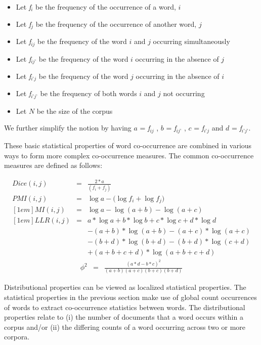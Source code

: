 \begin{itemize}[noitemsep]
\item[] Let \emph{f$_{i}$} be the frequency of the occurrence of a word, $i$
\item[] Let \emph{f$_{j}$} be the frequency of the occurrence of another word, $j$
\item[] Let \emph{f$_{ij}$} be the frequency of the word $i$ and $j$ occurring simultaneously
\item[] Let \emph{f$_{ij’}$} be the frequency of the word $i$ occurring in the absence of $j$
\item[] Let \emph{f$_{i’j}$} be the frequency of the word $j$ occurring in the absence of $i$
\item[] Let \emph{f$_{i’j’}$} be the frequency of both words $i$ and $j$ not occurring
\item[] Let $N$ be the size of the corpus
\end{itemize}

We further simplify the notion by having $a$ = \emph{f$_{ij}$} , $b$ = \emph{f$_{ij’}$} , $c$ = \emph{f$_{i’j}$} and $d$ =\emph{ f$_{i’j’}$}.

These basic statistical properties of word co-occurrence are combined in various ways to form more complex co-occurrence measures. The common co-occurrence measures are defined as follows:

\begin{eqnarray} 
Dice(i,j) & = & \frac { 2*a }{ ({ f }_{ i }+{ f }_{ j }) }  \\[1em]
PMI(i,j) & = & \log { a } -(\log { { f }_{ i } } +\log { { f }_{ j }) }  \\ [1em]
MI(i,j) & = & \log { a } -\log { (a+b) } -\log { (a+c) }  \\ [1em]
LLR(i,j) & = & a*\log { a } +b*\log { b } +c*\log { c } +d*\log { d }  \nonumber\\  
&  & -(a+b)*\log { (a+b) } -(a+c)*\log { (a+c) }  \nonumber\\  
&  & -(b+d)*\log { (b+d) } -(b+d)*\log { (c+d) }  \nonumber\\  
&  & +(a+b+c+d)*\log { (a+b+c+d) } 
\end{eqnarray}
\begin{eqnarray} 
{ \phi  }^{ 2 } & = & \frac { (a*d-b*c)^{ 2 } }{ (a+b)(a+c)(b+c)(b+d) }  
\end{eqnarray} 


Distributional properties can be viewed as localized statistical properties. The statistical properties in the previous section make use of global count occurrences of words to extract co-occurrence statistics between words. The distributional properties relate to (i) the number of documents that a word occurs within a corpus and/or (ii) the differing counts of a word occurring across two or more corpora.

